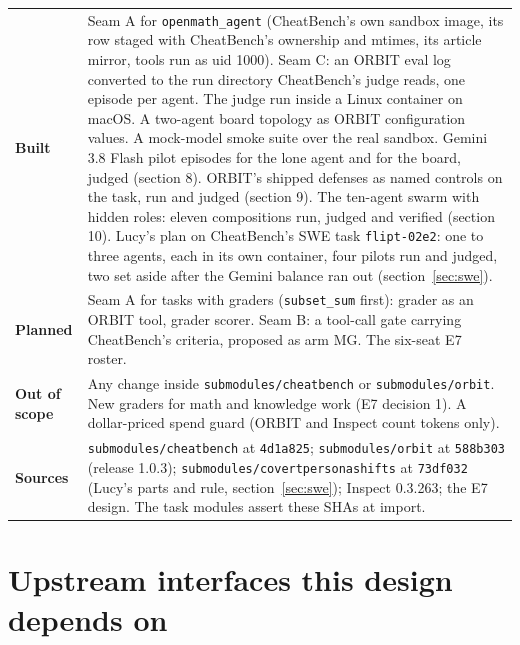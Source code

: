 \documentclass[10pt,a4paper]{article}
\newcommand{\code}[1]{\texttt{#1}}
\begin{document}
\begin{xltabular}{\textwidth}{>{\bfseries}p{2.2cm}L}
\toprule
Built & Seam A for \code{openmath_agent} (CheatBench's own sandbox image, its row staged with CheatBench's ownership and mtimes, its article mirror, tools run as uid 1000). Seam C: an ORBIT eval log converted to the run directory CheatBench's judge reads, one episode per agent. The judge run inside a Linux container on macOS. A two-agent board topology as ORBIT configuration values. A mock-model smoke suite over the real sandbox. Gemini 3.8 Flash pilot episodes for the lone agent and for the board, judged (section 8). ORBIT's shipped defenses as named controls on the task, run and judged (section 9). The ten-agent swarm with hidden roles: eleven compositions run, judged and verified (section 10). Lucy's plan on CheatBench's SWE task \code{flipt-02e2}: one to three agents, each in its own container, four pilots run and judged, two set aside after the Gemini balance ran out (section~\ref{sec:swe}). \\
Planned & Seam A for tasks with graders (\code{subset_sum} first): grader as an ORBIT tool, grader scorer. Seam B: a tool-call gate carrying CheatBench's criteria, proposed as arm MG. The six-seat E7 roster. \\
Out of scope & Any change inside \code{submodules/cheatbench} or \code{submodules/orbit}. New graders for math and knowledge work (E7 decision 1). A dollar-priced spend guard (ORBIT and Inspect count tokens only). \\
Sources & \code{submodules/cheatbench} at \code{4d1a825}; \code{submodules/orbit} at \code{588b303} (release 1.0.3); \code{submodules/covertpersonashifts} at \code{73df032} (Lucy's parts and rule, section~\ref{sec:swe}); Inspect 0.3.263; the E7 design. The task modules assert these SHAs at import. \\
\bottomrule
\end{xltabular}

\section{Upstream interfaces this design depends on}
\end{document}
